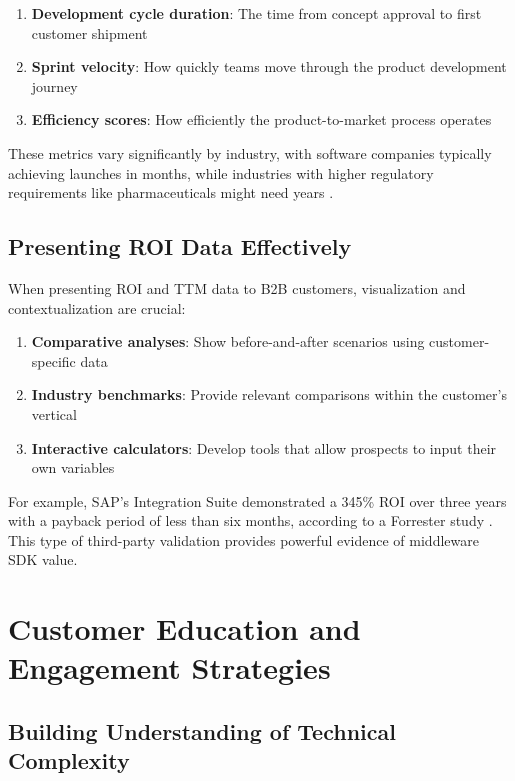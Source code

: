\documentclass[11pt,a4paper]{article}
\begin{document}
\begin{enumerate}
    \item \textbf{Development cycle duration}: The time from concept approval to first customer shipment
    \item \textbf{Sprint velocity}: How quickly teams move through the product development journey
    \item \textbf{Efficiency scores}: How efficiently the product-to-market process operates
\end{enumerate}

These metrics vary significantly by industry, with software companies typically achieving launches in months, while industries with higher regulatory requirements like pharmaceuticals might need years \cite{enkonix2023}.

\subsection{Presenting ROI Data Effectively}

When presenting ROI and TTM data to B2B customers, visualization and contextualization are crucial:

\begin{enumerate}
    \item \textbf{Comparative analyses}: Show before-and-after scenarios using customer-specific data
    \item \textbf{Industry benchmarks}: Provide relevant comparisons within the customer's vertical
    \item \textbf{Interactive calculators}: Develop tools that allow prospects to input their own variables
\end{enumerate}

For example, SAP's Integration Suite demonstrated a 345\% ROI over three years with a payback period of less than six months, according to a Forrester study \cite{sap2024}. This type of third-party validation provides powerful evidence of middleware SDK value.

\section{Customer Education and Engagement Strategies}

\subsection{Building Understanding of Technical Complexity}
\end{document}

